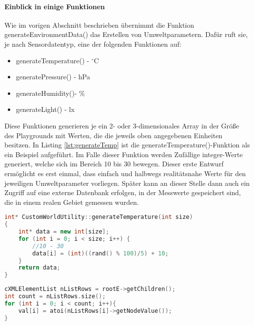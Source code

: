 \paragraph{Einblick in einige Funktionen}

Wie im vorigen Abschnitt beschrieben übernimmt die Funktion generateEnvironmentData() das Erstellen von Umweltparametern. Dafür ruft sie, je nach Sensordatentyp, eine der folgenden Funktionen auf:

\begin{multicols}{2}
\begin{itemize}
\item generateTemperature() - $^\circ $C
\item generatePressure() - hPa
\item generateHumidity()- \%
\item generateLight() - lx
\end{itemize}
\end{multicols}

Diese Funktionen generieren je ein 2- oder 3-dimensionales Array in der Größe des Playgrounds mit Werten, die die jeweils oben angegebenen Einheiten besitzen. In Listing \ref{lst:generateTemp} ist die generateTemperature()-Funktion als ein Beispiel aufgeführt. Im Falle dieser Funktion werden Zufällige integer-Werte generiert, welche sich im Bereich 10 bis 30 bewegen. Dieser erste Entwurf ermöglicht es erst einmal, dass einfach und halbwegs realitätsnahe Werte für den jeweiligen Umweltparameter vorliegen. Später kann an dieser Stelle dann auch ein Zugriff auf eine externe Datenbank erfolgen, in der Messwerte gespeichert sind, die in einem realen Gebiet gemessen wurden.

\begin{lstlisting}[language=C++, label=lst:generateTemp, caption=generateTemperature()]
int* CustomWorldUtility::generateTemperature(int size)
{
    int* data = new int[size];
    for (int i = 0; i < size; i++) {
        //10 - 30
        data[i] = (int)((rand() % 100)/5) + 10;
    }
    return data;
}
\end{lstlisting}

\begin{lstlisting}[language=C++, label=lst:readXML, caption=Kurzbeschreibung readXML()]
cXMLElementList nListRows = rootE->getChildren();
int count = nListRows.size();
for (int i = 0; i < count; i++){
    val[i] = atoi(nListRows[i]->getNodeValue());
}
\end{lstlisting}

